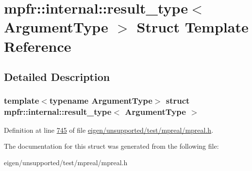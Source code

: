 \hypertarget{structmpfr_1_1internal_1_1result__type}{}\section{mpfr\+:\+:internal\+:\+:result\+\_\+type$<$ Argument\+Type $>$ Struct Template Reference}
\label{structmpfr_1_1internal_1_1result__type}


\subsection{Detailed Description}
\subsubsection*{template$<$typename Argument\+Type$>$\newline
struct mpfr\+::internal\+::result\+\_\+type$<$ Argument\+Type $>$}



Definition at line \hyperlink{eigen_2unsupported_2test_2mpreal_2mpreal_8h_source_l00745}{745} of file \hyperlink{eigen_2unsupported_2test_2mpreal_2mpreal_8h_source}{eigen/unsupported/test/mpreal/mpreal.\+h}.



The documentation for this struct was generated from the following file\+:\begin{DoxyCompactItemize}
\item 
eigen/unsupported/test/mpreal/mpreal.\+h\end{DoxyCompactItemize}
